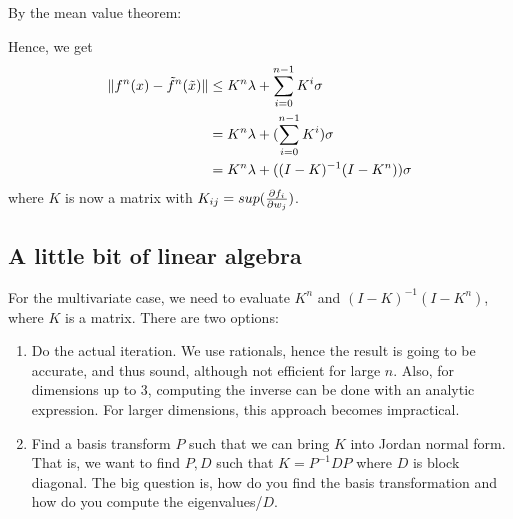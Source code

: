 By the mean value theorem:

Hence, we get
\begin{align}
\lVert f^n(x) - \tilde{f}^n(\tilde{x})\rVert &\le K^n \lambda + \sum^{n-1}_{i=0}K^i \sigma\\
  &= K^n \lambda + (\sum^{n-1}_{i=0} K^i) \sigma\\
  &= K^n \lambda + ( (I-K)^{-1}(I - K^n) )\sigma
\end{align}
where $K$ is now a matrix with $K_{ij} = sup(\frac{\partial f_i}{\partial w_j})$.

\subsection{A little bit of linear algebra}
For the multivariate case, we need to evaluate $K^n$ and $(I-K)^{-1}(I - K^n)$,
where $K$ is a matrix. There are two options:
\begin{enumerate}
\item Do the actual iteration. We use rationals, hence the result is going to be accurate,
and thus sound, although not efficient for large $n$. Also, for dimensions up to 3,
computing the inverse can be done with an analytic expression. For larger dimensions,
this approach becomes impractical.

\item Find a basis transform $P$ such that we can bring $K$ into Jordan normal form.
That is, we want to find $P, D$ such that $K = P^{-1}DP$ where $D$ is block diagonal.
The big question is, how do you find the basis transformation and how do you compute the
eigenvalues/$D$.
\end{enumerate}

